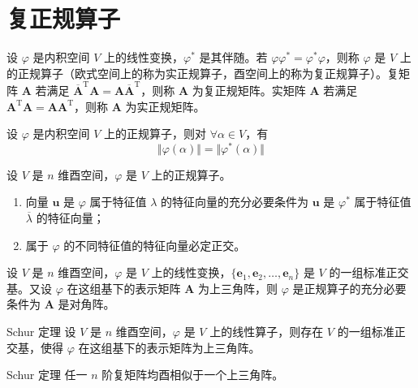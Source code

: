 
\section{复正规算子}

\begin{definition}
    设 $\varphi$ 是内积空间 $V$ 上的线性变换，$\varphi^*$ 是其伴随。若 $\varphi\varphi^* = \varphi^*\varphi$，则称 $\varphi$ 是 $V$ 上的正规算子（欧式空间上的称为实正规算子，酉空间上的称为复正规算子）。复矩阵 $\bm{A}$ 若满足 $\overline{\bm{A}}^{\mathrm{T}}\bm{A} = \bm{A}\overline{\bm{A}}^{\mathrm{T}}$，则称 $\bm{A}$ 为复正规矩阵。实矩阵 $\bm{A}$ 若满足 $\bm{A}^{\mathrm{T}}\bm{A} = \bm{AA}^{\mathrm{T}}$，则称 $\bm{A}$ 为实正规矩阵。
\end{definition}

\begin{lemma}
    设 $\varphi$ 是内积空间 $V$ 上的正规算子，则对 $\forall \alpha \in V$，有
    \[
        \Vert \varphi(\alpha) \Vert = \Vert \varphi^*(\alpha) \Vert
    \]
\end{lemma}

\begin{proposition}
    设 $V$ 是 $n$ 维酉空间，$\varphi $ 是 $V$ 上的正规算子。
    \begin{enumerate}
        \item 向量 $\bm{u}$ 是 $\varphi$ 属于特征值 $\lambda$ 的特征向量的充分必要条件为 $\bm{u}$ 是 $\varphi^*$ 属于特征值 $\overline{\lambda}$ 的特征向量；
        \item 属于 $\varphi$ 的不同特征值的特征向量必定正交。
    \end{enumerate}
\end{proposition}

\begin{lemma}
    设 $V$ 是 $n$ 维酉空间，$\varphi $ 是 $V$ 上的线性变换，$\{\bm{e}_{1}, \bm{e}_{2}, \ldots, \bm{e}_{n}\}$ 是 $V$ 的一组标准正交基。又设 $\varphi$ 在这组基下的表示矩阵 $\bm{A}$ 为上三角阵，则 $\varphi$ 是正规算子的充分必要条件为 $\bm{A}$ 是对角阵。
\end{lemma}

\begin{theorem}{Schur 定理}
    设 $V$ 是 $n$ 维酉空间，$\varphi $ 是 $V$ 上的线性算子，则存在 $V$ 的一组标准正交基，使得 $\varphi$ 在这组基下的表示矩阵为上三角阵。
\end{theorem}

\begin{corollary}{Schur 定理}
    任一 $n$ 阶复矩阵均酉相似于一个上三角阵。
\end{corollary}

